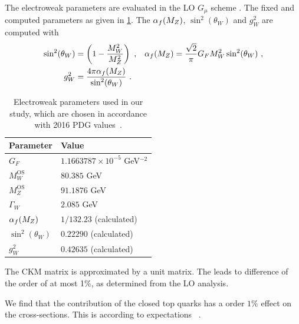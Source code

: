 The electroweak parameters are evaluated in the LO $G_\mu$ scheme \cite{Denner2000c}. The fixed and computed
parameters as given in \cref{tab:ewinput}. The $\alpha_f(M_Z)$,
$\sin^2(\theta_W)$ and $g_W^2$ are computed with
\begin{align}\label{eq:ewlorel}
\sin^2(\theta_W) &= \left(1-\frac{M_W^2}{M_Z^2}\right)\ , & \alpha_f(M_Z)&=\frac{\sqrt{2}}{\pi}G_F M_W^2
  \sin^2(\theta_W)\ ,\notag\\
g_W^2&=\frac{4\pi\alpha_f(M_Z) }{\sin^2(\theta_W)}\ .
\end{align}

\begin{table}[]
  \centering
  \begin{tabular}{p{3.5cm}p{5cm}}
    \toprule
    Parameter & Value  \\
    \midrule
    $G_F$ & $1.1663787 \times 10^{-5}$ GeV$^{-2}$ \\
    $M_W^{\text{OS}}$& $80.385$ GeV \\
    $M_Z^{\text{OS}}$& $91.1876$ GeV \\
    $\Gamma_W$& $2.085$ GeV \\
    $\alpha_f(M_Z)$ & $1/132.23$ (calculated)\\
    $\sin^2(\theta_W)$ & $0.22290$ (calculated)\\
    $g_W^2$ & $0.42635$ (calculated)\\
    \bottomrule
  \end{tabular}
  \caption{Electroweak parameters used in our study, which are chosen in accordance with 2016 PDG values~\cite{Patrignani:2016xqp}.}
  \label{tab:ewinput}
\end{table}

The CKM matrix is approximated by a unit matrix. 
The leads to difference of  the order of at most 1\%,
as determined from the LO analysis.

We find that the contribution of the closed top quarks has a order $1\%$ effect on
the cross-sections. This is according to expectations ~\cite{BH:W4j,BH:Z4j,Campbell:2016tcu}. 

